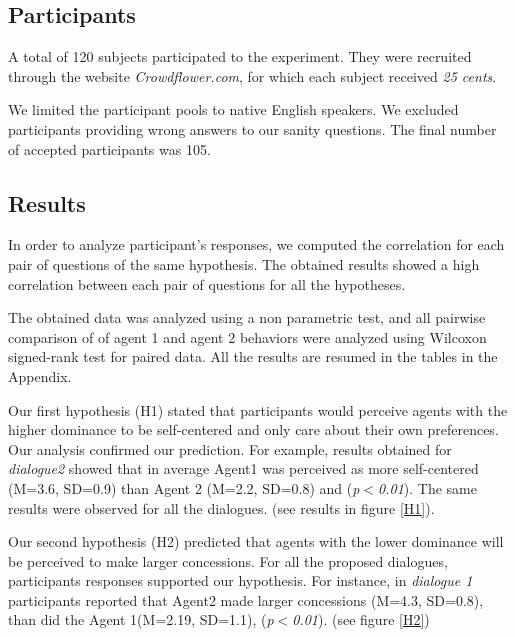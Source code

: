 \documentclass{llncs}
\begin{document}
	\subsection{Participants}
	A total of 120 subjects participated to the experiment. They were recruited through the website \emph{Crowdflower.com}, for which each subject received \textit{25 cents}. 
	
	We limited the participant pools to native English speakers. We excluded participants providing wrong answers to our sanity questions. The final number of accepted participants was 105. 
	
	\subsection{Results}
	In order to analyze participant's responses, we computed the correlation for each pair of questions of the same hypothesis. The obtained results showed a high correlation between each pair of questions for all the hypotheses.
	
	The obtained data was analyzed using a non parametric test, and all pairwise comparison of of agent 1 and agent 2 behaviors were analyzed using Wilcoxon signed-rank test for paired data. All the results are resumed in the tables in the Appendix.
	
	\par Our first hypothesis (H1) stated that participants would perceive agents with the higher dominance to be self-centered and only care about their own preferences. Our analysis confirmed our prediction. For example, results obtained for \textit{dialogue2} showed that in average Agent1 was perceived as more self-centered (M=3.6, SD=0.9) than Agent 2 (M=2.2, SD=0.8) and (\textit{p$<$0.01}). The same results were observed for all the dialogues. (see results in figure \ref{H1}).
	
	\par Our second hypothesis (H2) predicted that agents with the lower dominance will be perceived to make larger concessions. For all the proposed dialogues, participants responses supported our hypothesis. 
	For instance, in \textit{dialogue 1} participants reported that Agent2 made larger concessions (M=4.3, SD=0.8), than did the Agent 1(M=2.19, SD=1.1), (\textit{p$<$0.01}).  (see figure  \ref{H2})
	
\end{document}

